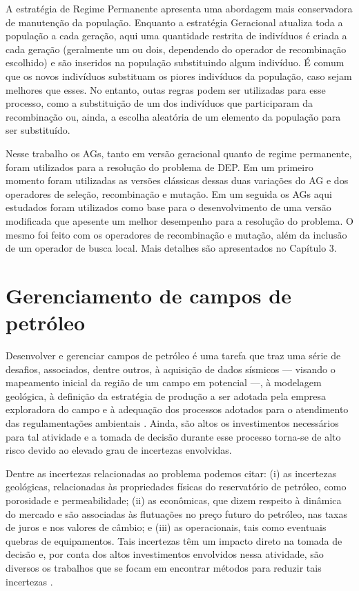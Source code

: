 A estratégia de Regime Permanente apresenta uma abordagem mais conservadora de manutenção da população. Enquanto a estratégia Geracional atualiza toda a população a cada geração, aqui uma quantidade restrita de indivíduos é criada a cada geração (geralmente um ou dois, dependendo do operador de recombinação escolhido) e são inseridos na população substituindo algum indivíduo. É comum que os novos indivíduos substituam os piores indivíduos da população, caso sejam melhores que esses. No entanto, outas regras podem ser utilizadas para esse processo, como a substituição de um dos indivíduos que participaram da recombinação ou, ainda, a escolha aleatória de um elemento da população para ser substituído.

Nesse trabalho os AGs, tanto em versão geracional quanto de regime permanente, foram utilizados para a resolução do problema de DEP.  Em um primeiro momento foram utilizadas as versões clássicas dessas duas variações do AG e dos operadores de seleção, recombinação e mutação. Em um seguida os AGs aqui estudados foram utilizados como base para o desenvolvimento de uma versão modificada que apesente um melhor desempenho para a resolução do problema. O mesmo foi feito com os operadores de recombinação e mutação, além da inclusão de um operador de busca local. Mais detalhes são apresentados no Capítulo 3.

\section{Gerenciamento de campos de petróleo}
\label{sec:section22}
Desenvolver e gerenciar campos de petróleo é uma tarefa que traz uma série de desafios, associados, dentre outros, à aquisição de dados sísmicos — visando o mapeamento inicial da região de um campo em potencial —, à modelagem geológica, à definição da estratégia de produção a ser adotada pela empresa exploradora do campo e à adequação dos processos adotados para o atendimento das regulamentações ambientais \cite{Morais2013}. Ainda, são altos os investimentos necessários para tal atividade e a tomada de decisão durante esse processo torna-se de alto risco devido ao elevado grau de incertezas envolvidas.

Dentre as incertezas relacionadas ao problema podemos citar: (i) as incertezas geológicas, relacionadas às propriedades físicas do reservatório de petróleo, como porosidade e permeabilidade; (ii) as econômicas, que dizem respeito à dinâmica do mercado e são associadas às flutuações no preço futuro do petróleo, nas taxas de juros e nos valores de câmbio; e (iii) as operacionais, tais como eventuais quebras de equipamentos. Tais incertezas têm um impacto direto na tomada de decisão e, por conta dos altos investimentos envolvidos nessa atividade, são diversos os trabalhos que se focam em encontrar métodos para reduzir tais incertezas \cite{Oliveira2017,Maschio2010, Silva2012}.


